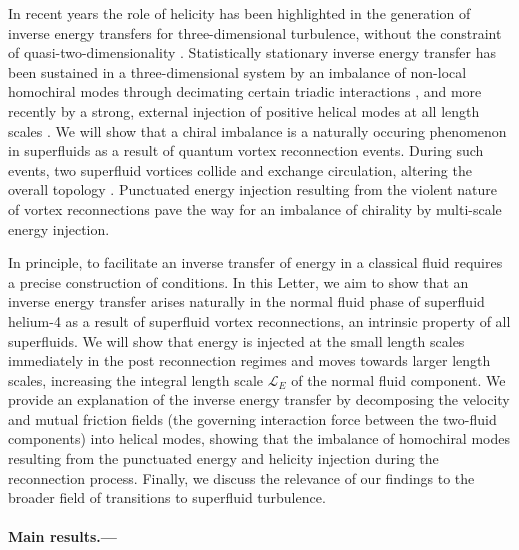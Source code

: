 \documentclass[%
 reprint,
 amsmath,amssymb,
 aps,
 prl,
]{revtex4-2}
\begin{document}
In recent years the role of helicity has been highlighted in the generation of inverse energy transfers for three-dimensional turbulence, without the constraint of quasi-two-dimensionality \cite{chen2003,biferaleInverseEnergyCascade2012a}. Statistically stationary inverse energy transfer has been sustained in a three-dimensional system by an imbalance of non-local homochiral modes through decimating certain triadic interactions \cite{biferaleInverseEnergyCascade2012a}, and more recently by a strong, external injection of positive helical modes at all length scales \cite{plunianInverseCascadeEnergy2020a}. We will show that a chiral imbalance is a naturally occuring phenomenon in superfluids as a result of quantum vortex reconnection events.  During such events, two superfluid vortices collide and exchange circulation, altering the overall topology \cite{villois2020irreversible,zuccher2012quantum}. Punctuated energy injection resulting from the violent nature of vortex reconnections \cite{stasiak2024quantum} pave the way for an imbalance of chirality by multi-scale energy injection. 

In principle, to facilitate an inverse transfer of energy in a classical fluid requires a precise construction of conditions. In this Letter, we aim to show that an inverse energy transfer arises naturally in the normal fluid phase of superfluid helium-4 as a result of superfluid vortex reconnections, an intrinsic property of all superfluids. We will show that energy is injected at the small length scales immediately in the post reconnection regimes and moves towards larger length scales, increasing the integral length scale $\mathcal{L}_E$ of the normal fluid component. We provide an explanation of the inverse energy transfer by decomposing the velocity and mutual friction fields (the governing interaction force between the two-fluid components) into helical modes, showing that the imbalance of homochiral modes resulting from the punctuated energy and helicity injection during the reconnection process. Finally, we discuss the relevance of our findings to the broader field of transitions to superfluid turbulence. 

\paragraph*{Main results.---} 
\end{document}
